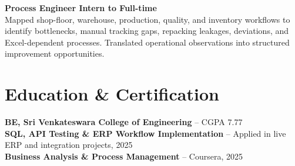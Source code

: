 \documentclass[10pt,a4paper]{article}
\begin{document}
\textbf{Process Engineer Intern to Full-time}\\
Mapped shop-floor, warehouse, production, quality, and inventory workflows to identify bottlenecks, manual tracking gaps, repacking leakages, deviations, and Excel-dependent processes. Translated operational observations into structured improvement opportunities.

\section*{Education \& Certification}
\textbf{BE, Sri Venkateswara College of Engineering} -- CGPA 7.77\\
\textbf{SQL, API Testing \& ERP Workflow Implementation} -- Applied in live ERP and integration projects, 2025\\
\textbf{Business Analysis \& Process Management} -- Coursera, 2025
\end{document}
